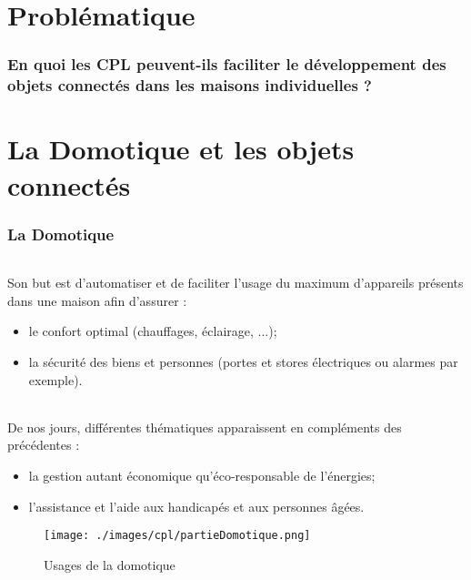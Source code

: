 \part*{Problématique}
    \section*{En quoi les CPL peuvent-ils faciliter le développement des objets connectés dans les maisons individuelles ?}
    \clearpage



\part{La Domotique et les objets connectés}

    \section{La Domotique}

        \paragraph{}
Son but est d’automatiser et de faciliter l'usage du maximum d'appareils présents dans une maison afin d'assurer :
            \begin{itemize}
                \item le confort optimal (chauffages, éclairage, ...);
                \item la sécurité des biens et personnes (portes et stores électriques ou alarmes par exemple).
            \end{itemize}

        \paragraph{}
De nos jours, différentes thématiques apparaissent en compléments des précédentes :
            \begin{itemize}
                \item la gestion autant économique qu'éco-responsable de l'énergies;
                \item l'assistance et l'aide aux handicapés et aux personnes âgées.
            \end{itemize}

        \begin{figure}[h]
            \begin{center}
                \texttt{[image: ./images/cpl/partieDomotique.png]}
            \end{center}
                \caption{ Usages de la domotique }
                \label{Usages de la domotique}
        \end{figure}

